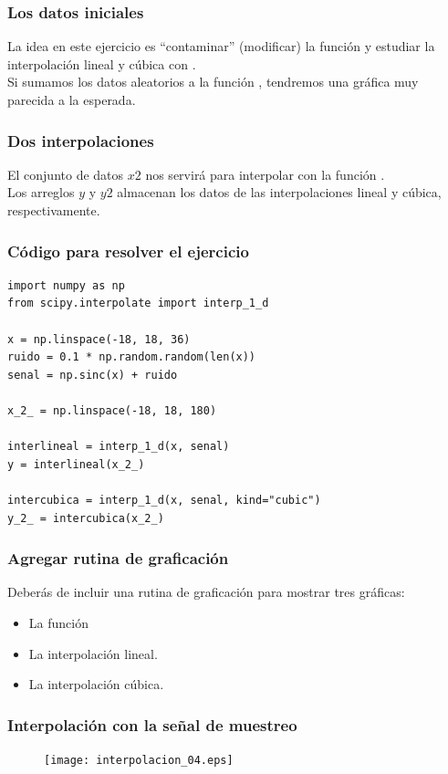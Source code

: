 \begin{frame}
\frametitle{Los datos iniciales}
La idea en este ejercicio es \enquote{contaminar} (modificar) la función  y estudiar la interpolación lineal y cúbica con \python.
\\
\bigskip
Si sumamos los datos aleatorios a la función , tendremos una gráfica muy parecida a la esperada.
\end{frame}
\begin{frame}
\frametitle{Dos interpolaciones}
El conjunto de datos $x2$ nos servirá para interpolar con la función .
\\
\bigskip
Los arreglos $y$ y $y2$ almacenan los datos de las interpolaciones lineal y cúbica, respectivamente.
\end{frame}
\begin{frame}[fragile]
\frametitle{Código para resolver el ejercicio}
\begin{lstlisting}[caption=Código para el análisis, style= FormattedNumber, basicstyle=\linespread{0.9}\ttfamily\small, columns=fullflexible]
import numpy as np
from scipy.interpolate import interp_1_d

x = np.linspace(-18, 18, 36)
ruido = 0.1 * np.random.random(len(x))
senal = np.sinc(x) + ruido

x_2_ = np.linspace(-18, 18, 180)

interlineal = interp_1_d(x, senal)
y = interlineal(x_2_)

intercubica = interp_1_d(x, senal, kind="cubic")
y_2_ = intercubica(x_2_)
\end{lstlisting}
\end{frame}
\begin{frame}
\frametitle{Agregar rutina de graficación}
Deberás de incluir una rutina de graficación para mostrar tres gráficas:
\begin{itemize}
\item La función 
\item La interpolación lineal.
\item La interpolación cúbica.
\end{itemize}
\end{frame}
\begin{frame}
\frametitle{Interpolación con la señal de muestreo}
\begin{figure}
\texttt{[image: interpolacion\_04.eps]}
\end{figure}
\end{frame}
